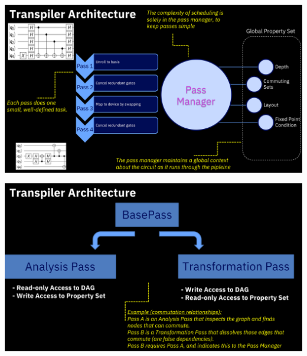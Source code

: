 \documentclass[aspectratio=169,11pt,hyperref={colorlinks=true}]{beamer}
\begin{document}
{
\begin{frame}
    \includegraphics[width=\textwidth]{passmanager.png}
\end{frame}

\begin{frame}
    \includegraphics[width=\textwidth]{passmanager_2.png}
\end{frame}
}
\end{document}

